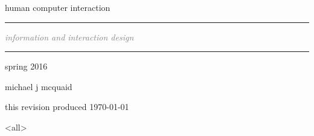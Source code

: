 \mode*

\begin{titlepage}

  \thispagestyle{empty}

\begin{center}

  \vspace{12pt}

  \hrulefill

  \vspace{64pt}

  \vspace{8pt}

  {\sc human computer interaction}

  \vspace{6pt}

  \rule{196pt}{0.5pt}

  \vspace{12pt}

  {\large\it \textcolor{gray}{information and
  interaction design}}

  \vspace{6pt}

  \rule{196pt}{0.5pt}

  \vspace{6pt}

  {\sc spring 2016

  \vspace{8pt}

  \vspace{168pt}

  michael j m{\scriptsize c}quaid

  \vspace{24pt}

  {\large {}}

  \vfill

  this revision produced \MakeLowercase{\today}}

  \vspace{18pt}

  \hrulefill

\end{center}

\end{titlepage}

\mode<all>
